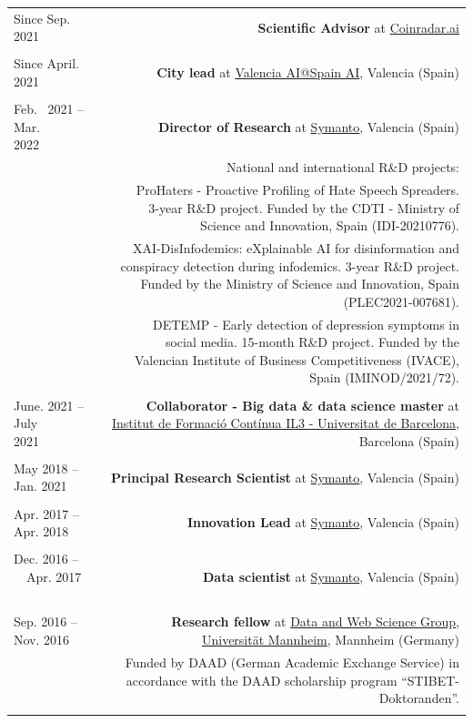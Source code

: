 \documentclass[10pt]{article}
\begin{document}
\begin{tabular}{L!{\VRule}R}
Since Sep.~ 2021 &{\textbf{Scientific Advisor} at \href{https://coinradar.ai/}{Coinradar.ai}}\\
&\\

Since April.~ 2021 &{\textbf{City lead} at \href{https://www.spain-ai.com/}{Valencia AI@Spain AI}, Valencia (Spain)}\\
&\\

Feb.~ 2021 -- Mar. 2022~~~~ &{\textbf{Director of Research} at \href{https://www.symanto.com/}{Symanto}, Valencia (Spain)}\\
&\scriptsize{National and international R\&D projects:}\\
&\scriptsize{\textcolor{white}{ssss}ProHaters - Proactive Profiling of Hate Speech Spreaders. 3-year R\&D project. Funded by the CDTI - Ministry of Science and Innovation, Spain (IDI-20210776).}\\
&\scriptsize{\textcolor{white}{ssss}XAI-DisInfodemics: eXplainable AI for disinformation and conspiracy detection during infodemics. 3-year R\&D project. Funded by the Ministry of Science and Innovation, Spain (PLEC2021-007681).}\\
&\scriptsize{\textcolor{white}{ssss}DETEMP - Early detection of depression symptoms in social media. 15-month R\&D project. Funded by the Valencian Institute of Business Competitiveness (IVACE), Spain (IMINOD/2021/72)}. \\&\\

June. 2021 -- July 2021~~~~~ &{\textbf{Collaborator - Big data \& data science master} at  \href{https://www.il3.ub.edu/}{Institut de Formació Contínua IL3 - Universitat de Barcelona}, Barcelona (Spain)}\\
&\\
May 2018 -- Jan. 2021~~~ &{\textbf{Principal Research Scientist} at \href{https://www.symanto.com/}{Symanto}, Valencia (Spain)}\\&\\
Apr. 2017 -- Apr. 2018~~~ &{\textbf{Innovation Lead} at \href{https://www.symanto.com/}{Symanto}, Valencia (Spain)}\\&\\
Dec. 2016 -- ~~Apr. 2017 ~~&{\textbf{Data scientist} at \href{https://www.symanto.com/}{Symanto}, Valencia (Spain)}\\&\\
Sep. 2016 -- Nov. 2016 ~~&{\textbf{Research fellow} at \href{http://dws.informatik.uni-mannheim.de/en/home/}{Data and Web Science Group, Universit{\"a}t Mannheim}, Mannheim (Germany)}\\
&\scriptsize{Funded by DAAD (German Academic Exchange Service) in accordance with the DAAD scholarship program ``STIBET-Doktoranden''.}\\&\\


\end{tabular}
\end{document}
